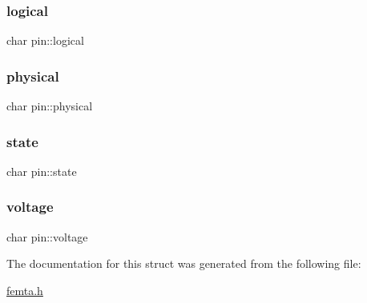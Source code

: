 \mbox{\label{structpin_a5904e86c433f331ce55ed3ead575a802}} 
\subsubsection{\texorpdfstring{logical}{logical}}
{\footnotesize\ttfamily char pin\+::logical}

\mbox{\label{structpin_a0d3051114699672c833f272c06f2c658}} 
\subsubsection{\texorpdfstring{physical}{physical}}
{\footnotesize\ttfamily char pin\+::physical}

\mbox{\label{structpin_a59c3020dc417fbda00ae4926db264a51}} 
\subsubsection{\texorpdfstring{state}{state}}
{\footnotesize\ttfamily char pin\+::state}

\mbox{\label{structpin_a11d53a2f512e95511a962537d333d9b5}} 
\subsubsection{\texorpdfstring{voltage}{voltage}}
{\footnotesize\ttfamily char pin\+::voltage}



The documentation for this struct was generated from the following file\+:\begin{DoxyCompactItemize}
\item 
\hyperlink{femta_8h}{femta.\+h}\end{DoxyCompactItemize}

